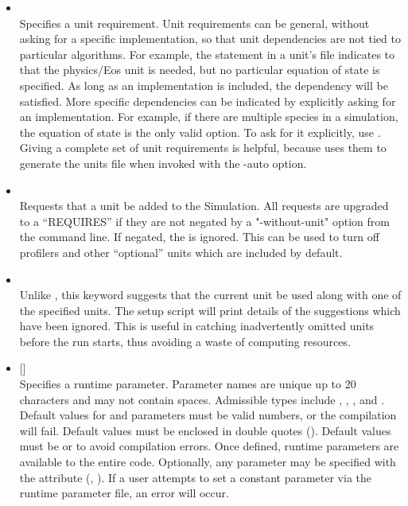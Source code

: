 \begin{itemize}
\item {} \metavar{unit[/sub-unit[/implementation...]]  [}
 \metavar{unit[/sub-unit...]]...}\\
Specifies a unit requirement. Unit requirements can be general, without
asking for a specific implementation, so that unit dependencies are not
tied to particular algorithms. For example, the statement
 in a unit's  file indicates to
 that the physics/Eos unit is needed, but no particular equation
of state is specified. As long as an  implementation is included, 
the dependency will be satisfied. More specific dependencies can be
indicated by explicitly asking for an implementation. For example, if
there are multiple species in a simulation, the  equation
of state is the only valid option. To ask for it explicitly, use
. Giving a complete set of unit
requirements is helpful, because  uses them to generate the units
file when invoked with the -auto option.

\item {} \\
Requests that a unit be added to the Simulation. All requests are upgraded
to a ``REQUIRES'' if they are not negated by a "-without-unit" option from the
command line. If negated, the  is ignored. This can be used to
turn off profilers and other ``optional'' units which are included by default.

\item {} \\
Unlike , this keyword suggests that the current unit be
used along with one of the specified units. The setup script will
print details of the suggestions which have been ignored. This is
useful in catching inadvertently omitted units before the run starts,
thus avoiding a waste of computing resources.



\item {} 
  [] \\
Specifies a runtime parameter. Parameter names are unique up to 20 characters and
may not contain spaces. Admissible types include , ,
, and .  Default values for  and 
parameters must be valid numbers, or the compilation will fail. Default
 values must be enclosed in double quotes ().
Default  values must be  or  to
avoid compilation errors. Once defined, runtime parameters are available to the
entire code. Optionally, any parameter may be specified with the 
attribute (\eg, ).
If a user attempts to set a constant parameter via the runtime parameter file,
an error will occur.


\end{itemize}
